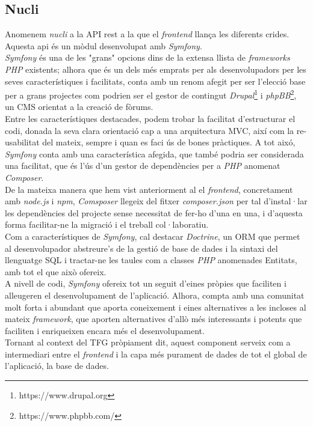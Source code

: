 \subsection{Nucli}
Anomenem \textit{nucli} a la API rest a la que el \textit{frontend} llança les diferents crides.
Aquesta api és un mòdul desenvolupat amb \textit{Symfony}.\\
\newline \textit{Symfony} és una de les "grans" opcions dins de la extensa llista de \textit{frameworks PHP} existents; alhora que és un dels més emprats per als desenvolupadors per les seves característiques i facilitats, conta amb un renom afegit per ser l'elecció base per a grans projectes com podrien ser el gestor de contingut \textit{Drupal}\footnote{https://www.drupal.org} i \textit{phpBB}\footnote{https://www.phpbb.com/}, un CMS orientat a la creació de fòrums.\\
\newline Entre les característiques destacades, podem trobar la facilitat d'estructurar el codi, donada la seva clara orientació cap a una arquitectura MVC, així com la re-usabilitat del mateix, sempre i quan es faci ús de bones pràctiques. A tot aixó, \textit{Symfony} conta amb una característica afegida, que també podria ser considerada una facilitat, que és l'ús d'un gestor de dependències per a \textit{PHP} anomenat \textit{Composer}.\\
De la mateixa manera que hem vist anteriorment al el \textit{frontend}, concretament amb \textit{node.js} i \textit{npm}, \textit{Comsposer} llegeix del fitxer \textit{composer.json} per tal d'instal·lar les dependències del projecte sense necessitat de fer-ho d'una en una, i d'aquesta forma facilitar-ne la migració i el treball col·laboratiu.\\
\newline Com a característiques de \textit{Symfony}, cal destacar \textit{Doctrine}, un ORM que permet al desenvolupador abstreure's de la gestió de base de dades i la sintaxi del llenguatge SQL i tractar-ne les taules com a classes \textit{PHP} anomenades Entitats, amb tot el que això ofereix.\\
\newline A nivell de codi, \textit{Symfony} ofereix tot un seguit d'eines pròpies que faciliten i alleugeren el desenvolupament de l'aplicació. Alhora, compta amb una comunitat molt forta i abundant que aporta coneixement i eines alternatives a les incloses al mateix \textit{framework}, que aporten alternatives d'allò més interessants i potents que faciliten i enriqueixen encara més el desenvolupament.\\
\newline Tornant al context del TFG pròpiament dit, aquest component serveix com a intermediari entre el \textit{frontend} i la capa més purament de dades de tot el global de l'aplicació, la base de dades. \\


